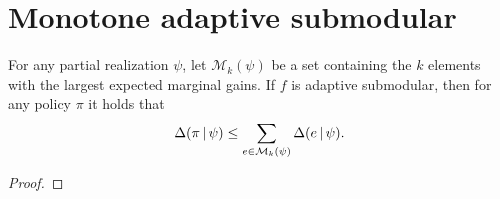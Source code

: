 \section{Monotone adaptive submodular}



\begin{lemma}
  For any partial realization $\psi$, let $\mathcal{M}_k(\psi)$ be a set containing the $k$ elements with the largest expected marginal gains.
  If $f$ is adaptive submodular, then for any policy $\pi$ it holds that
  \begin{align*}
    \Delta(\pi\,|\,\psi) \leq \sum_{e \in \mathcal{M}_k(\psi)} \Delta(e\,|\,\psi).
  \end{align*}
\end{lemma}
\begin{proof}
\end{proof}